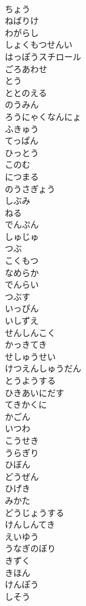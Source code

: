 \documentclass[8pt]{extreport}
\begin{document}
\begin{CJK}{UTF8}{min}
\\	ちょう
\\	ねばりけ
\\	わがらし
\\	しょくもつせんい
\\	はっぽうスチロール
\\	ごろあわせ
\\	とう
\\	ととのえる
\\	のうみん
\\	ろうにゃくなんにょ
\\	ふきゅう
\\	てっぱん
\\	ひっとう
\\	このむ
\\	につまる
\\	のうさぎょう
\\	しぶみ
\\	ねる
\\	でんぷん
\\	しゅじゅ
\\	つぶ
\\	こくもつ
\\	なめらか
\\	でんらい
\\	つぶす
\\	いっぴん
\\	いしずえ
\\	せんしんこく
\\	かっきてき
\\	せしゅうせい
\\	けつえんしゅうだん
\\	とうようする
\\	ひきあいにだす
\\	てきかくに
\\	かごん
\\	いつわ
\\	こうせき
\\	うらぎり
\\	ひぼん
\\	どうぜん
\\	ひげき
\\	みかた
\\	どうじょうする
\\	けんしんてき
\\	えいゆう
\\	うなぎのぼり
\\	きずく
\\	きほん
\\	けんぽう
\\	しそう

\end{CJK}
\end{document}
